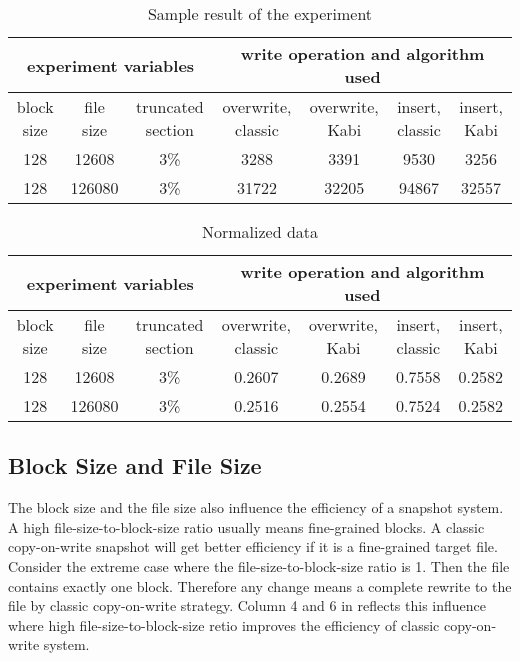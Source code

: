 \begin{lscape} 
\begin{table}
\caption{Sample result of the experiment}
\label{tab:sample_result}
\begin{center}
\begin{tabular}{|c|c|c|c|c|c|c|}
\hline
\multicolumn{3}{|c|}{experiment variables} & \multicolumn{4}{c|}{write operation and algorithm used} \\
\hline
block size & file size & truncated section & overwrite, classic & overwrite, Kabi & insert, classic & insert, Kabi\\
\hline
128 & 12608 & 3\% & 3288 & 3391 & 9530 & 3256 \\
\hline
128 & 126080 & 3\% & 31722 & 32205 & 94867 & 32557 \\
\hline
\end{tabular}
\end{center}
\end{table}

\begin{table}
\caption{Normalized data}
\label{tab:norm}
\begin{center}
\begin{tabular}{|c|c|c|c|c|c|c|}
\hline
\multicolumn{3}{|c|}{experiment variables} & \multicolumn{4}{c|}{write operation and algorithm used} \\
\hline
block size & file size & truncated section & overwrite, classic & overwrite, Kabi & insert, classic & insert, Kabi\\
\hline
128 & 12608 & 3\% & 0.2607 & 0.2689 & 0.7558 & 0.2582 \\
\hline
128 & 126080 & 3\% & 0.2516 & 0.2554 & 0.7524 & 0.2582 \\
\hline
\end{tabular}
\end{center}
\end{table}
\end{lscape}

\subsection{Block Size and File Size}

    The block size and the file size also influence the efficiency of a snapshot system. A high file-size-to-block-size ratio usually means fine-grained blocks. A classic copy-on-write snapshot will get better efficiency if it is a fine-grained target file. Consider the extreme case where the file-size-to-block-size ratio is 1. Then the file contains exactly one block. Therefore any change means a complete rewrite to the file by classic copy-on-write strategy. Column 4 and 6 in  reflects this influence where high file-size-to-block-size retio improves the efficiency of classic copy-on-write system.


